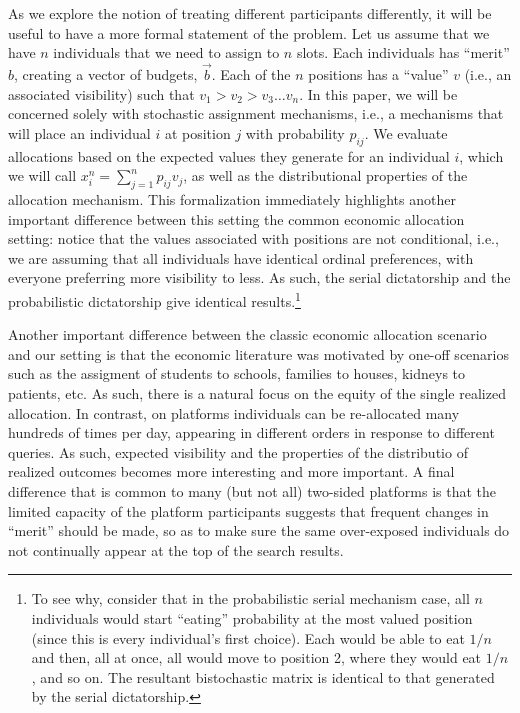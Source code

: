 As we explore the notion of treating different participants
differently, it will be useful to have a more formal statement of the
problem. Let us assume that we have $n$ individuals that we need to
assign to $n$ slots. Each individuals has ``merit'' $b$, creating a
vector of budgets, $\vec{b}$.  Each of the $n$ positions has a
``value'' $v$ (i.e., an associated visibility) such that $v_1 > v_2 >
v_3 \ldots v_n$. In this paper, we will be concerned solely with
stochastic assignment mechanisms, i.e., a mechanisms that will place
an individual $i$ at position $j$ with probability $p_{ij}$. We
evaluate allocations based on the expected values they generate for an
individual $i$, which we will call $x^n_i = \sum_{j=1}^n p_{ij}v_j$,
as well as the distributional properties of the allocation
mechanism. This formalization immediately highlights another important
difference between this setting the common economic allocation
setting: notice that the values associated with positions are not
conditional, i.e., we are assuming that all individuals have identical
ordinal preferences, with everyone preferring more visibility to
less. As such, the serial dictatorship and the probabilistic
dictatorship give identical results.\footnote{To see why, consider
  that in the probabilistic serial mechanism case, all $n$ individuals
  would start ``eating'' probability at the most valued position
  (since this is every individual's first choice). Each would be able
  to eat $1/n$ and then, all at once, all would move to position 2,
  where they would eat $1/n$, and so on. The resultant bistochastic
  matrix is identical to that generated by the serial dictatorship.}

Another important difference between the classic economic allocation
scenario and our setting is that the economic literature was motivated
by one-off scenarios such as the assigment of students to schools,
families to houses, kidneys to patients, etc. As such, there is a
natural focus on the equity of the single realized allocation. In
contrast, on platforms individuals can be re-allocated many hundreds
of times per day, appearing in different orders in response to
different queries. As such, expected visibility and the properties of
the distributio of realized outcomes becomes more interesting and more
important.  A final difference that is common to many (but not all)
two-sided platforms is that the limited capacity of the platform
participants suggests that frequent changes in ``merit'' should be
made, so as to make sure the same over-exposed individuals do not
continually appear at the top of the search results.

